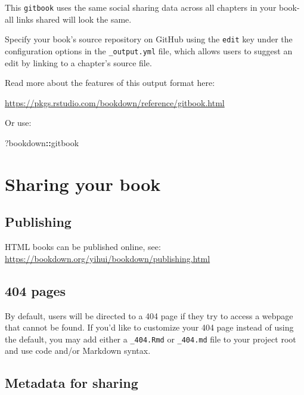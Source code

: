 \documentclass[
]{book}
\newenvironment{Shaded}{\begin{snugshade}}{\end{snugshade}}
\newcommand{\NormalTok}[1]{#1}
\newcommand{\SpecialCharTok}[1]{\textcolor[rgb]{0.81,0.36,0.00}{\textbf{#1}}}
\begin{document}
This \texttt{gitbook} uses the same social sharing data across all
chapters in your book- all links shared will look the same.

Specify your book's source repository on GitHub using the \texttt{edit}
key under the configuration options in the \texttt{\_output.yml} file,
which allows users to suggest an edit by linking to a chapter's source
file.

Read more about the features of this output format here:

\url{https://pkgs.rstudio.com/bookdown/reference/gitbook.html}

Or use:

\begin{Shaded}
\begin{Highlighting}[]
\NormalTok{?bookdown}\SpecialCharTok{::}\NormalTok{gitbook}
\end{Highlighting}
\end{Shaded}

\hypertarget{sharing-your-book-1}{%
\chapter{Sharing your book}\label{sharing-your-book-1}}

\hypertarget{publishing-1}{%
\section{Publishing}\label{publishing-1}}

HTML books can be published online, see:
\url{https://bookdown.org/yihui/bookdown/publishing.html}

\hypertarget{pages-1}{%
\section{404 pages}\label{pages-1}}

By default, users will be directed to a 404 page if they try to access a
webpage that cannot be found. If you'd like to customize your 404 page
instead of using the default, you may add either a \texttt{\_404.Rmd} or
\texttt{\_404.md} file to your project root and use code and/or Markdown
syntax.

\hypertarget{metadata-for-sharing-1}{%
\section{Metadata for sharing}\label{metadata-for-sharing-1}}
\end{document}
